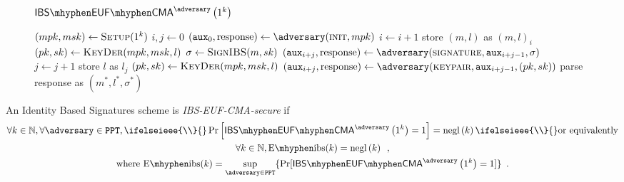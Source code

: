   \begin{figure}[!htbp]
    \begin{gamebox}{$\mathsf{IBS \mhyphen EUF \mhyphen
    CMA}^{\adversary}\left(1^k\right)$}
      \begin{algorithmic}[1]
        \State $(mpk, msk) \gets \textsc{Setup}(1^k)$
        \State $i, j \gets 0$
        \State $(\mathtt{aux}_0, \mathrm{response}) \gets
        \adversary(\textsc{init}, mpk)$
            \State $i \gets i + 1$
            \State store $(m, l)$ as $(m, l)_i$
            \State $(pk, sk) \gets \textsc{KeyDer}(mpk, msk, l)$
            \State $\sigma \gets \textsc{SignIBS}(m, sk)$
            \State $(\mathtt{aux}_{i+j}, \mathrm{response}) \gets
            \adversary(\textsc{signature}, \mathtt{aux}_{i+j-1}, \sigma)$
          \Else \ 
            \State $j \gets j + 1$
            \State store $l$ as $l_j$
            \State $(pk, sk) \gets \textsc{KeyDer}(mpk, msk, l)$
            \State $(\mathtt{aux}_{i+j}, \mathrm{response}) \gets
            \adversary(\textsc{keypair}, \mathtt{aux}_{i+j-1}, (pk, sk))$
          \EndIf
        \EndWhile
        \State parse response as $(m^*, l^*, \sigma^*)$
          \State {}
        \Else
          \State {}
        \EndIf
      \end{algorithmic}
    \end{gamebox}
    \caption{}
    \label{game:ibs}
  \end{figure}
  \begin{definition}
    \label{def:ibs:secure}
    An Identity Based Signatures scheme is \emph{\textsf{IBS-EUF-CMA}-secure}
    if
    \begin{gather*}
      \forall k \in \mathbb{N}, \forall \adversary \in \mathtt{PPT},
      \ifelseieee{\\}{}
      \Pr\left[\mathsf{IBS \mhyphen EUF \mhyphen
      CMA}^{\adversary}\left(1^k\right) = 1\right] = \mathrm{negl}\left(k\right)
      \ifelseieee{\\}{}
      \text{or equivalently} \\
      \forall k \in \mathbb{N}, \mathrm{E \mhyphen ibs}(k) =
      \mathrm{negl}\left(k\right) \enspace, \\
      \text{where } \mathrm{E \mhyphen ibs}(k) = \underset{\adversary \in
      \mathtt{PPT}}{\sup}\{\Pr[\mathsf{IBS \mhyphen EUF \mhyphen
      CMA}^{\adversary}\left(1^k\right) = 1]\} \enspace.
    \end{gather*}
  \end{definition}

